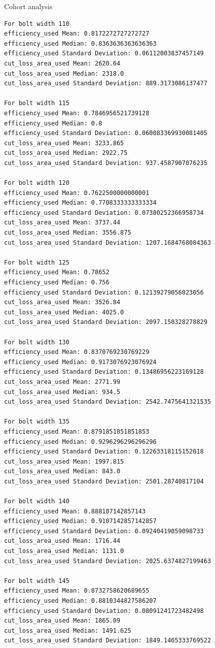 Cohort analysis
\begin{verbatim}
For bolt width 110
efficiency_used Mean: 0.8172272727272727
efficiency_used Median: 0.8363636363636363
efficiency_used Standard Deviation: 0.06112003837457149
cut_loss_area_used Mean: 2620.64
cut_loss_area_used Median: 2318.0
cut_loss_area_used Standard Deviation: 889.3173086137477

For bolt width 115
efficiency_used Mean: 0.7846956521739128
efficiency_used Median: 0.8
efficiency_used Standard Deviation: 0.060083369930081405
cut_loss_area_used Mean: 3233.865
cut_loss_area_used Median: 2922.75
cut_loss_area_used Standard Deviation: 937.4587907076235

For bolt width 120
efficiency_used Mean: 0.7622500000000001
efficiency_used Median: 0.7708333333333334
efficiency_used Standard Deviation: 0.07380252366958734
cut_loss_area_used Mean: 3737.44
cut_loss_area_used Median: 3556.875
cut_loss_area_used Standard Deviation: 1207.1684768084363

For bolt width 125
efficiency_used Mean: 0.78652
efficiency_used Median: 0.756
efficiency_used Standard Deviation: 0.12139279056023056
cut_loss_area_used Mean: 3526.84
cut_loss_area_used Median: 4025.0
cut_loss_area_used Standard Deviation: 2097.150328278829

For bolt width 130
efficiency_used Mean: 0.8370769230769229
efficiency_used Median: 0.9173076923076924
efficiency_used Standard Deviation: 0.13486956223169128
cut_loss_area_used Mean: 2771.99
cut_loss_area_used Median: 934.5
cut_loss_area_used Standard Deviation: 2542.7475641321535

For bolt width 135
efficiency_used Mean: 0.8791851851851853
efficiency_used Median: 0.9296296296296296
efficiency_used Standard Deviation: 0.12263318115152018
cut_loss_area_used Mean: 1997.815
cut_loss_area_used Median: 843.0
cut_loss_area_used Standard Deviation: 2501.28740817104

For bolt width 140
efficiency_used Mean: 0.888107142857143
efficiency_used Median: 0.9107142857142857
efficiency_used Standard Deviation: 0.09240419059098733
cut_loss_area_used Mean: 1716.44
cut_loss_area_used Median: 1131.0
cut_loss_area_used Standard Deviation: 2025.6374827199463

For bolt width 145
efficiency_used Mean: 0.8732758620689655
efficiency_used Median: 0.8810344827586207
efficiency_used Standard Deviation: 0.08091241723482498
cut_loss_area_used Mean: 1865.09
cut_loss_area_used Median: 1491.625
cut_loss_area_used Standard Deviation: 1849.1465333769522


\end{verbatim}
